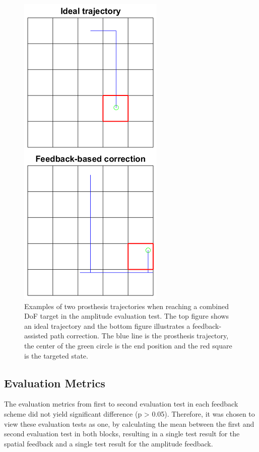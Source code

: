 \begin{figure}[h]                 
	\includegraphics[width=.7\textwidth]{figures/trajectories}
	\caption{Examples of two prosthesis trajectories when reaching a combined DoF target in the amplitude evaluation test. The top figure shows an ideal trajectory and the bottom figure illustrates a feedback-assisted path correction. The blue line is the prosthesis trajectory, the center of the green circle is the end position and the red square is the targeted state.}
	\label{fig:pa:trajec} 
\end{figure}

\subsection{Evaluation Metrics}
The evaluation metrics from first to second evaluation test in each feedback scheme did not yield significant difference (p > 0.05). Therefore, it was chosen to view these evaluation tests as one, by calculating the mean between the first and second evaluation test in both blocks, resulting in a single test result for the spatial feedback and a single test result for the amplitude feedback. 

